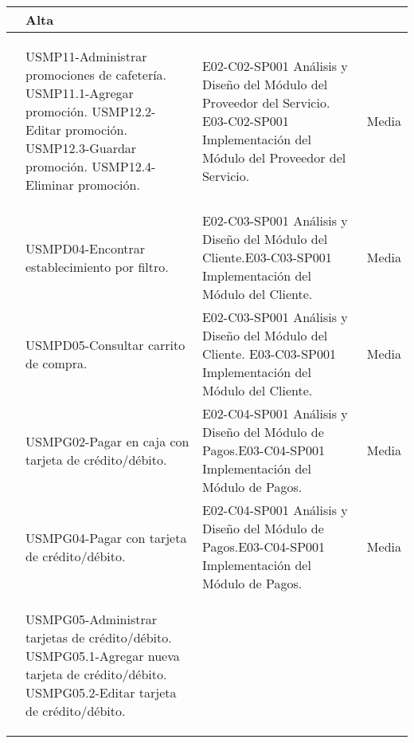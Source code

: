 \begin{center}
\begin{longtable}{|p{}|p{}|p{}|p{}|}
											   & Alta\\
\hline
	\getElementById[Requerimiento]{REQMP11} & \begin{Titemize}
													\Titem USMP11-Administrar promociones de cafetería.
													\Titem USMP11.1-Agregar promoción.
													\Titem USMP12.2-Editar promoción.
													\Titem USMP12.3-Guardar promoción.
													\Titem USMP12.4-Eliminar promoción.
											  \end{Titemize} & \Titem E02-C02-SP001 Análisis y Diseño del Módulo del Proveedor del Servicio. \Titem E03-C02-SP001 Implementación del Módulo del Proveedor del Servicio.& Media\\
\hline
	\getElementById[Requerimiento]{REQMPD06} & \begin{Titemize}
													\Titem USMPD04-Encontrar establecimiento por filtro.
												\end{Titemize}&\Titem E02-C03-SP001 Análisis y Diseño del Módulo del Cliente.\Titem E03-C03-SP001 Implementación del Módulo del Cliente. & Media\\
\hline
	\getElementById[Requerimiento]{REQMPD07} & \begin{Titemize}
													\Titem USMPD05-Consultar carrito de compra.
												\end{Titemize} &\Titem E02-C03-SP001 Análisis y Diseño del Módulo del Cliente. \Titem E03-C03-SP001 Implementación del Módulo del Cliente.& Media\\
\hline
	\getElementById[Requerimiento]{REQMPG02} & \begin{Titemize}
													\Titem USMPG02-Pagar en caja con tarjeta de crédito/débito.
												\end{Titemize} &\Titem E02-C04-SP001 Análisis y Diseño del Módulo de Pagos.\Titem E03-C04-SP001 Implementación del Módulo de Pagos. & Media\\
\hline
	\getElementById[Requerimiento]{REQMPG04} & \begin{Titemize}
													\Titem USMPG04-Pagar con tarjeta de crédito/débito.
												\end{Titemize}&\Titem E02-C04-SP001 Análisis y Diseño del Módulo de Pagos.\Titem E03-C04-SP001 Implementación del Módulo de Pagos. & Media\\
\hline
	\getElementById[Requerimiento]{REQMPG05} & \begin{Titemize}
													\Titem USMPG05-Administrar tarjetas de crédito/débito.
													\Titem USMPG05.1-Agregar nueva tarjeta de crédito/débito.
													\Titem USMPG05.2-Editar tarjeta de crédito/débito.

\end{Titemize}
\end{longtable}
\end{center}
